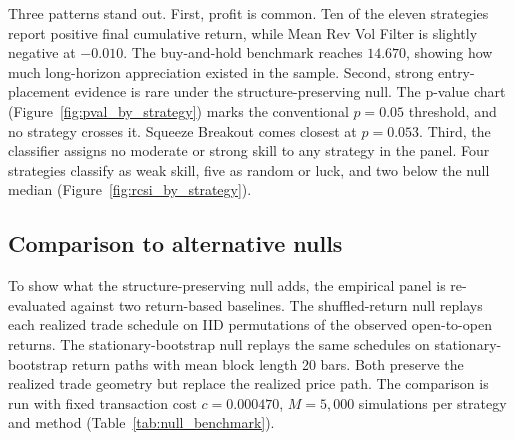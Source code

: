 \documentclass[preprint,12pt]{elsarticle}
\theoremstyle{definition}
\begin{document}
Three patterns stand out. First, profit is common. Ten of the eleven strategies report positive final cumulative return, while Mean Rev Vol Filter is slightly negative at $-0.010$. The buy-and-hold benchmark reaches $14.670$, showing how much long-horizon appreciation existed in the sample. Second, strong entry-placement evidence is rare under the structure-preserving null. The p-value chart (Figure~\ref{fig:pval_by_strategy}) marks the conventional $p=0.05$ threshold, and no strategy crosses it. Squeeze Breakout comes closest at $p=0.053$. Third, the classifier assigns no moderate or strong skill to any strategy in the panel. Four strategies classify as weak skill, five as random or luck, and two below the null median (Figure~\ref{fig:rcsi_by_strategy}).

\subsection{Comparison to alternative nulls}

To show what the structure-preserving null adds, the empirical panel is re-evaluated against two return-based baselines. The shuffled-return null replays each realized trade schedule on IID permutations of the observed open-to-open returns. The stationary-bootstrap null replays the same schedules on stationary-bootstrap return paths with mean block length 20 bars. Both preserve the realized trade geometry but replace the realized price path. The comparison is run with fixed transaction cost $c=0.000470$, $M=5{,}000$ simulations per strategy and method (Table~\ref{tab:null_benchmark}).
\end{document}

